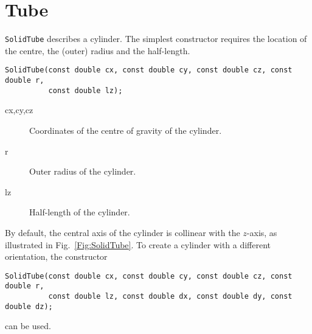 \section{Tube}
\texttt{SolidTube} describes a cylinder. The simplest constructor requires
the location of the centre, the (outer) radius and the half-length. 
\begin{lstlisting}
SolidTube(const double cx, const double cy, const double cz, const double r,
          const double lz);
\end{lstlisting}
\begin{description}
\item[cx,cy,cz] Coordinates of the centre of gravity of the cylinder.
\item[r] Outer radius of the cylinder.
\item[lz] Half-length of the cylinder.
\end{description}
By default, the central axis of the cylinder is collinear with the $z$-axis,
 as illustrated in Fig.~\ref{Fig:SolidTube}. 
To create a cylinder with a different orientation, the constructor
\begin{lstlisting}
SolidTube(const double cx, const double cy, const double cz, const double r,
          const double lz, const double dx, const double dy, const double dz);
\end{lstlisting} 
can be used. 


